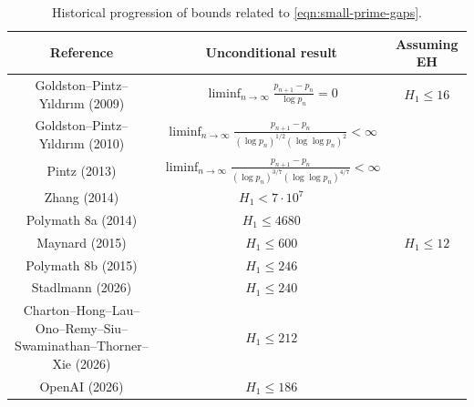 \begin{table}[ht]
    \caption{Historical progression of bounds related to \eqref{eqn:small-prime-gaps}.}
    \label{small-primegap-table}
    \centering
    \renewcommand{\arraystretch}{2.2}
    \begin{tabular}{|c|c|c|}
    \hline
    Reference & Unconditional result & Assuming EH \\
    \hline
    Goldston--Pintz--Yıldırım (2009) \cite{goldston_primes_2009} & $\displaystyle\liminf_{n\to\infty}\frac{p_{n + 1} - p_n}{\log p_n} = 0$ & $H_1 \le 16$ \\
    \hline
    Goldston--Pintz--Yıldırım (2010) \cite{goldston_primes_2010} & $\displaystyle\liminf_{n\to\infty}\frac{p_{n + 1} - p_n}{(\log p_n)^{1/2}(\log\log p_n)^2} < \infty$ & \\
    \hline
    Pintz (2013) \cite{Pintz_3747} & $\displaystyle\liminf_{n\to\infty}\frac{p_{n + 1} - p_n}{(\log p_n)^{3/7}(\log\log p_n)^{4/7}} < \infty$ & \\
    \hline
    Zhang (2014) \cite{zhang_bounded_2014} & $H_1 < 7\cdot 10^7$ & \\
    \hline
    Polymath 8a (2014) \cite{castryck_new_2014} & $H_1 \le 4680$ & \\
    \hline
    Maynard (2015) \cite{maynard_small_2015} & $H_1 \le 600$ & $H_1 \le 12$ \\
    \hline
    Polymath 8b (2015) \cite{polymath_variants_2014} & $H_1 \le 246$ & \\
    \hline
    Stadlmann (2026) \cite{Stadlmann_240} & $H_1 \le 240$ & \\
    \hline
    Charton--Hong--Lau--Ono--Remy--Siu--Swaminathan--Thorner--Xie (2026) \cite{AxiomMath_212} & $H_1 \le 212$ & \\
    \hline
    OpenAI (2026) \cite{OpenAI_186} & $H_1 \le 186$ & \\
    \end{tabular}
    \end{table}

